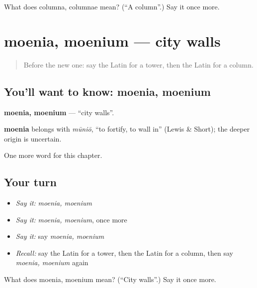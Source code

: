 \begin{tcolorbox}[breakable,colback=teal!4,colframe=teal!35!black,title={Before you move on}]
What does columna, columnae mean? (\textquotedblleft{}A column\textquotedblright{}.) Say it once more.
\end{tcolorbox}
\section[moenia, moenium]{moenia, moenium — city walls}

\label{lesson:LA-C280-moenia}



\begin{quote}
Before the new one: say the Latin for a tower, then the Latin for a column.
\end{quote}

\subsection*{You'll want to know: moenia, moenium}
\textbf{moenia, moenium} — \textquotedblleft{}city walls\textquotedblright{}.

\begin{cousinweb}
\textbf{moenia} belongs with \emph{mūniō}, \textquotedblleft{}to fortify, to wall in\textquotedblright{} (Lewis \& Short); the deeper origin is uncertain.
\end{cousinweb}

\begin{grammarlens}[title={What you've built}]
One more word for this chapter.
\end{grammarlens}

\subsection*{Your turn}
\begin{itemize}
\raggedright
  \item \emph{Say it:} \emph{moenia, moenium}
  \item \emph{Say it:} \emph{moenia, moenium}, once more
  \item \emph{Say it:} say \emph{moenia, moenium}
  \item \emph{Recall:} say the Latin for a tower, then the Latin for a column, then say \emph{moenia, moenium} again
\end{itemize}

\begin{tcolorbox}[breakable,colback=teal!4,colframe=teal!35!black,title={Before you move on}]
What does moenia, moenium mean? (\textquotedblleft{}City walls\textquotedblright{}.) Say it once more.
\end{tcolorbox}
